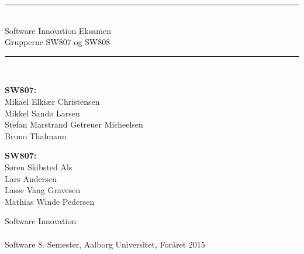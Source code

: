 %
%
%
%
% 



\begin{titlepage}



\begin{center}
\newcommand{\HRule}{\rule{\linewidth}{0.5mm}}
\HRule \\[0.4cm]
\Huge Software Innovation Eksamen \\[0.3cm]
	\Large Grupperne SW807 og SW808\\[0.4cm]

\HRule \\[1cm]
\noindent
\begin{minipage}{7cm}
  \textbf{SW807:}\\
  {\small Mikael Elkiær Christensen\\
  Mikkel Sandø Larsen\\
  Stefan Marstrand Getreuer Micheelsen\\
  Bruno Thalmann}
\end{minipage}
 \hfill
\begin{minipage}{5cm}
  \textbf{SW807:}\\
  {\small Søren Skibsted Als\\
  Lars Andersen\\
  Lasse Vang Gravesen\\
  Mathias Winde Pedersen}
\end{minipage}

\vfill
{\Large Software Innovation}
\\ ~\\
{\large Software 8. Semester, Aalborg Universitet, Foråret 2015}

\end{center}
\end{titlepage}

